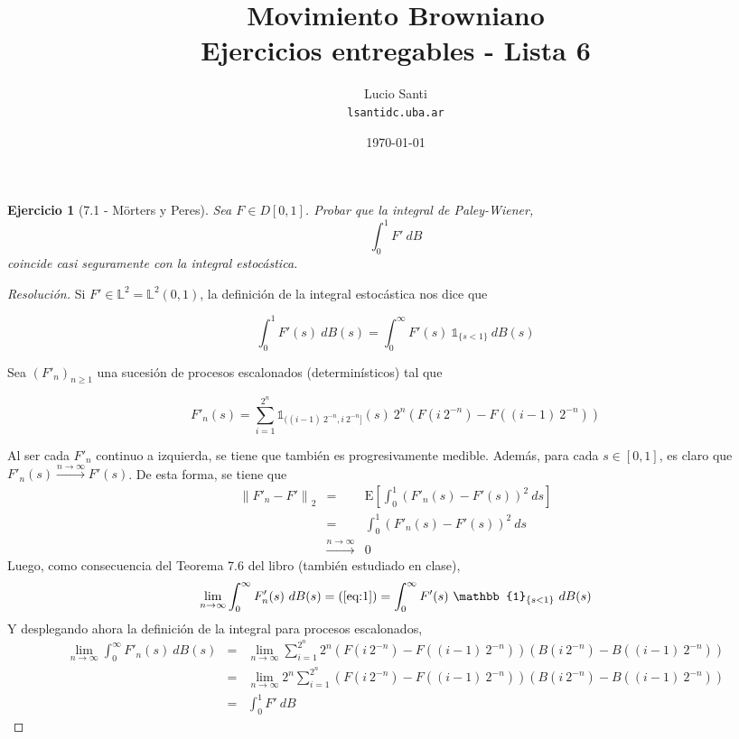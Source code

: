 \documentclass[a4paper,11pt]{article}
\title{Movimiento Browniano\\
      \small{Ejercicios entregables - Lista 6}}
\author{Lucio Santi\\
        \texttt{lsanti\at dc.uba.ar}}
\date{\today}
\newcommand{\Exp}[1]{\ensuremath{\textrm{E}\left[#1\right]}}
\newcommand{\norm}[1]{\left\lVert#1\right\rVert}
\newcommand{\Dif}[1]{d #1}
\newcommand{\LL}{\mathbb{L}^2}
\newcommand{\Ind}[1]{\mathbb{1}_{#1}}
\newtheorem*{ej}{Ejercicio}
\begin{document}
\maketitle

\begin{ej}[7.1 - Mörters y Peres] 
Sea $F \in D[0,1]$. Probar que la integral de Paley-Wiener,
$$\int_0^1{F' ~\Dif{B}}$$
coincide casi seguramente con la integral estocástica.
\end{ej}

\begin{proof}[Resoluci\'on]
Si $F'\in \LL = \LL(0,1)$, la definición de la integral estocástica nos dice que

\begin{equation}
\int_0^1{F'(s)~\Dif{B(s)}} = \int_0^{\infty}{F'(s) ~\Ind{\{s < 1\}} ~\Dif{B(s)}}
\label{eq:1}
\end{equation}

Sea $(F'_n)_{n \geq 1}$ una sucesión de procesos escalonados (determinísticos) tal que

$$F'_n(s) = \sum_{i=1}^{2^n}{\Ind{((i-1)~2^{-n}, i~2^{-n}]}(s) ~ 2^n \left(F(i ~2^{-n}) - F((i-1) ~2^{-n})\right)}$$

Al ser cada $F'_n$ continuo a izquierda, se tiene que también es progresivamente medible. Además, para
cada $s \in [0,1]$, es claro que $F'_n(s) \overset{n \to \infty}{\longrightarrow} F'(s)$. De esta forma,
se tiene que 
\begin{eqnarray*}
    \norm{F'_n - F'}_2 &=& \Exp{\int_0^1{(F'_n(s) - F'(s))^2 ~ \Dif{s}}} \\
        &=& \int_0^1{(F'_n(s) - F'(s))^2 ~ \Dif{s}} \\
        &\overset{n \to \infty}{\longrightarrow}& 0
\end{eqnarray*}
Luego, como consecuencia del Teorema 7.6 del libro (también estudiado en clase),
$$\lim_{n \to \infty}{\int_0^{\infty}{F'_n(s) ~ \Dif{B(s)}}} = (\ref{eq:1}) = \int_0^{\infty}{F'(s) ~\Ind{\{s < 1\}} ~\Dif{B(s)}}$$
Y desplegando ahora la definición de la integral para procesos escalonados,
\begin{eqnarray*}
    \lim_{n \to \infty}{\int_0^{\infty}{F'_n(s) ~ \Dif{B(s)}}} &=&
    \lim_{n \to \infty}{\sum_{i=1}^{2^n}{2^n \left(F(i ~2^{-n}) - F((i-1) ~2^{-n})\right)} \left(B(i ~2^{-n}) - B((i-1) ~2^{-n}) \right)} \\
    &=& \lim_{n \to \infty}{2^n \sum_{i=1}^{2^n}{\left(F(i ~2^{-n}) - F((i-1) ~2^{-n})\right)} \left(B(i ~2^{-n}) - B((i-1) ~2^{-n}) \right)} \\
    &=& \int_0^1{F' ~\Dif{B}}
\end{eqnarray*}

\end{proof}
\end{document}

